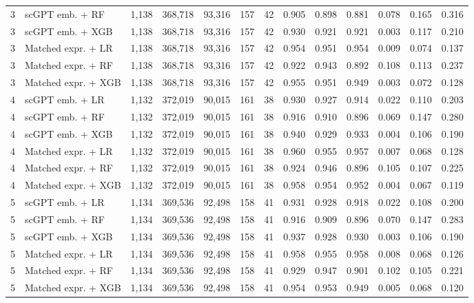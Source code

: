\begin{landscape}
\begin{longtable}{rllrrrrcccccc}
3 & scGPT emb. + RF & 1,138 & 368,718 & 93,316 & 157 & 42 & 0.905 & 0.898 & 0.881 & 0.078 & 0.165 & 0.316 \\
3 & scGPT emb. + XGB & 1,138 & 368,718 & 93,316 & 157 & 42 & 0.930 & 0.921 & 0.921 & 0.003 & 0.117 & 0.210 \\
3 & Matched expr. + LR & 1,138 & 368,718 & 93,316 & 157 & 42 & 0.954 & 0.951 & 0.954 & 0.009 & 0.074 & 0.137 \\
3 & Matched expr. + RF & 1,138 & 368,718 & 93,316 & 157 & 42 & 0.922 & 0.943 & 0.892 & 0.108 & 0.113 & 0.237 \\
3 & Matched expr. + XGB & 1,138 & 368,718 & 93,316 & 157 & 42 & 0.955 & 0.951 & 0.949 & 0.003 & 0.072 & 0.128 \\
4 & scGPT emb. + LR & 1,132 & 372,019 & 90,015 & 161 & 38 & 0.930 & 0.927 & 0.914 & 0.022 & 0.110 & 0.203 \\
4 & scGPT emb. + RF & 1,132 & 372,019 & 90,015 & 161 & 38 & 0.916 & 0.910 & 0.896 & 0.069 & 0.147 & 0.280 \\
4 & scGPT emb. + XGB & 1,132 & 372,019 & 90,015 & 161 & 38 & 0.940 & 0.929 & 0.933 & 0.004 & 0.106 & 0.190 \\
4 & Matched expr. + LR & 1,132 & 372,019 & 90,015 & 161 & 38 & 0.960 & 0.955 & 0.957 & 0.007 & 0.068 & 0.128 \\
4 & Matched expr. + RF & 1,132 & 372,019 & 90,015 & 161 & 38 & 0.924 & 0.946 & 0.896 & 0.105 & 0.107 & 0.225 \\
4 & Matched expr. + XGB & 1,132 & 372,019 & 90,015 & 161 & 38 & 0.958 & 0.954 & 0.952 & 0.004 & 0.067 & 0.119 \\
5 & scGPT emb. + LR & 1,134 & 369,536 & 92,498 & 158 & 41 & 0.931 & 0.928 & 0.918 & 0.022 & 0.108 & 0.200 \\
5 & scGPT emb. + RF & 1,134 & 369,536 & 92,498 & 158 & 41 & 0.916 & 0.909 & 0.896 & 0.070 & 0.147 & 0.283 \\
5 & scGPT emb. + XGB & 1,134 & 369,536 & 92,498 & 158 & 41 & 0.937 & 0.928 & 0.930 & 0.003 & 0.106 & 0.190 \\
5 & Matched expr. + LR & 1,134 & 369,536 & 92,498 & 158 & 41 & 0.958 & 0.955 & 0.958 & 0.008 & 0.068 & 0.126 \\
5 & Matched expr. + RF & 1,134 & 369,536 & 92,498 & 158 & 41 & 0.929 & 0.947 & 0.901 & 0.102 & 0.105 & 0.221 \\
5 & Matched expr. + XGB & 1,134 & 369,536 & 92,498 & 158 & 41 & 0.954 & 0.953 & 0.949 & 0.005 & 0.068 & 0.120 \\
\end{longtable}\end{landscape}
